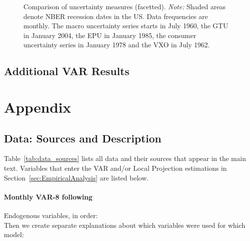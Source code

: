 \documentclass[a4paper,11pt,listof=nochaptergap,oneside,pointednumbers,bibtotoc,bigheadings,liststotoc]{scrbook}
\theoremstyle{mysatz}
\theoremstyle{mydefinition}
\theoremstyle{mybemerkung}
\renewcommand*{\paragraph}[1]{\subsubsection*{#1} \vspace{-3mm}} %
\begin{document}
\begin{landscape}
\begin{figure}[!t]
   \centering
   \setlength\fboxsep{0pt}
   \setlength\fboxrule{0pt}
      \caption[Comparison of uncertainty measures (combined).]{Comparison of uncertainty measures (facetted).
      \textit{Note:} Shaded areas denote NBER recession dates in the US. Data frequencies are monthly. The macro uncertainty series starts in July 1960, the GTU in January 2004, the EPU in January 1985, the consumer uncertainty series in January 1978  and the VXO in July 1962.}   \label{fig:bloom_shock_all_until2016}
\end{figure}
\end{landscape}



\section{Additional VAR Results}




\chapter{Appendix}
\label{DataAndCode}
\section{Data: Sources and Description}
\label{sec:data}
Table~\ref{tab:data_sources} lists all data and their sources that appear in the main text. Variables that enter the VAR and/or Local Projection estimations in Section~\ref{sec:EmpiricalAnalysis} are listed below.


\paragraph{Monthly VAR-8 following \citet{bloom:09}} Endogenous variables, in order:\\
Then we create separate explanations about which variables were used for which model:\\
\end{document}
